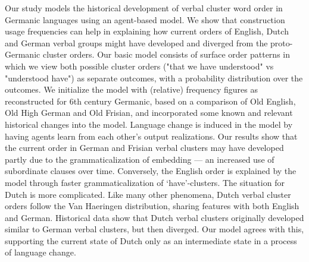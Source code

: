 \documentclass[10pt, a4paper, twopage, headinclude, footinclude, BCOR5mm]{book}
\begin{document}
\begin{table}[t!]
\end{table} 
\begin{table}[t!]
\end{table} 
\noindent
Our study models the historical development of verbal cluster word order in Germanic languages using an agent-based model. We show that construction usage frequencies can help in explaining how current orders of English, Dutch and German verbal groups might have developed and diverged from the proto-Germanic cluster orders. Our basic model consists of surface order patterns in which we view both possible cluster orders ("that we have understood" vs "understood have") as separate outcomes, with a probability distribution over the outcomes. We initialize the model with (relative) frequency figures as reconstructed for 6th century Germanic, based on a comparison of Old English, Old High German and Old Frisian, and incorporated some known and relevant historical changes into the model. Language change is induced in the model by having agents learn from each other's output realizations.  Our results show that the current order in German and Frisian verbal clusters may have developed partly due to the grammaticalization of embedding --- an increased use of subordinate clauses over time. Conversely, the English order is explained by the model through faster grammaticalization of `have'-clusters. The situation for Dutch is more complicated. Like many other phenomena, Dutch verbal cluster orders follow the Van Haeringen distribution, sharing features with both English and German. Historical data show that Dutch verbal clusters originally developed similar to German verbal clusters, but then diverged. Our model agrees with this, supporting the current state of Dutch only as an intermediate state in a process of language change.  
\end{document}
